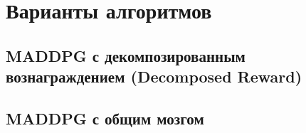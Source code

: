 \section{Варианты алгоритмов}

\subsection{MADDPG с декомпозированным вознаграждением (Decomposed Reward)} %



\subsection{MADDPG с общим мозгом} %

